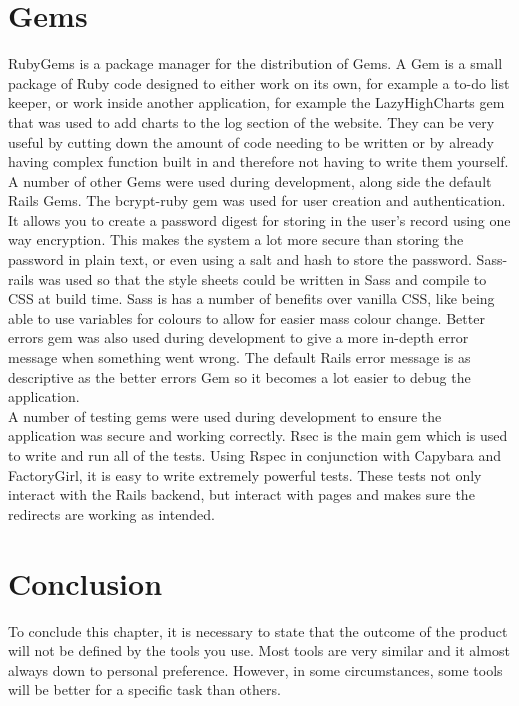 \section{Gems}
RubyGems \citep{rubygems:2009} is a package manager for the distribution of Gems. A Gem is a small package of Ruby code designed to either work on its own, for example a to-do list keeper, or work inside another application, for example the LazyHighCharts gem that was used to add charts to the log section of the website. They can be very useful by cutting down the amount of code needing to be written or by already having complex function built in and therefore not having to write them yourself. A number of other Gems were used during development, along side the default Rails Gems. The bcrypt-ruby gem was used for user creation and authentication. It allows you to create a password digest for storing in the user's record using one way encryption. This makes the system a lot more secure than storing the password in plain text, or even using a salt and hash to store the password. Sass-rails was used so that the style sheets could be written in Sass and compile to CSS at build time. Sass is has a number of benefits over vanilla CSS, like being able to use variables for colours to allow for easier mass colour change. Better errors gem was also used during development to give a more in-depth error message when something went wrong. The default Rails error message is as descriptive as the better errors Gem so it becomes a lot easier to debug the application.\\
A number of testing gems were used during development to ensure the application was secure and working correctly. Rsec is the main gem which is used to write and run all of the tests. Using Rspec in conjunction with Capybara and FactoryGirl, it is easy to write extremely powerful tests. These tests not only interact with the Rails backend, but interact with pages and makes sure the redirects are working as intended.

\section{Conclusion}
To conclude this chapter, it is necessary to state that the outcome of the product will not be defined by the tools you use. Most tools are very similar and it almost always down to personal preference. However, in some circumstances, some tools will be better for a specific task than others.